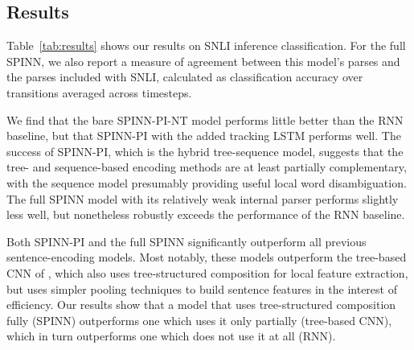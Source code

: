 \documentclass[11pt]{article}
\begin{document}
\begin{table*}[t]
\begin{tabular}{lrrrr}
    \bottomrule
  \end{tabular}
\caption{\protect\label{tab:results}Results on SNLI 3-way inference classification. Params. is the approximate number of trained parameters (excluding word embeddings for all models). Trans. acc. is the model's accuracy in predicting parsing transitions at test time. Train and test are SNLI classification accuracy.}
\end{table*}

\subsection{Results}

Table~\ref{tab:results} shows our results on SNLI inference classification. For the full SPINN, we also report a measure of agreement between this model's parses and the parses included with SNLI, calculated as classification accuracy over transitions averaged across timesteps.

We find that the bare SPINN-PI-NT model performs little better than the RNN baseline, but that SPINN-PI with the added tracking LSTM performs well. The success of SPINN-PI, which is the hybrid tree-sequence model, suggests that the tree- and sequence-based encoding methods are at least partially complementary, with the sequence model presumably providing useful local word disambiguation. The full SPINN model with its relatively weak internal parser performs slightly less well, but nonetheless robustly exceeds the performance of the RNN baseline.

Both SPINN-PI and the full SPINN significantly outperform all previous sentence-encoding models. Most notably, these models outperform the tree-based CNN of \citet{mou2015recognizing}, which also uses tree-structured composition for local feature extraction, but uses simpler pooling techniques to build sentence features in the interest of efficiency. Our results show that a model that uses tree-structured composition fully (SPINN) outperforms one which uses it only partially (tree-based CNN), which in turn outperforms one which does not use it at all (RNN).
\end{document}
